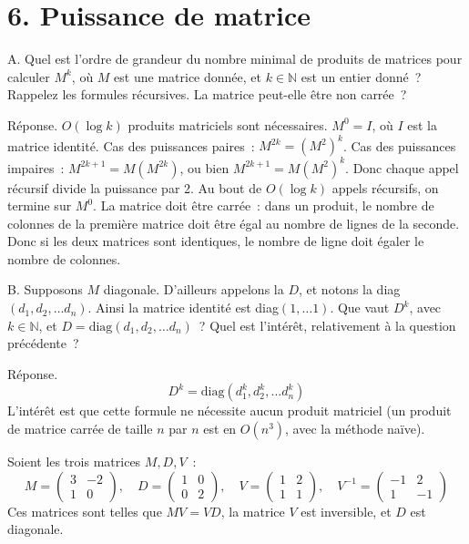 \documentclass[11pt]{article}
\def\N{\mathbb N}
\begin{document}
\section*{6. Puissance de matrice}

A. Quel est l'ordre de grandeur du nombre minimal de produits de matrices pour calculer $M^k$, où $M$ est une matrice donnée, et $k\in \N$ est un entier donné~?
Rappelez les formules récursives. La matrice peut-elle être non carrée~?

Réponse. $O(\log k)$ produits matriciels sont nécessaires.
$M^0=I$, où $I$ est la matrice identité.
Cas des puissances paires~: $M^{2k} = (M^2)^k$.
Cas des puissances impaires~:  $M^{2k+1} = M (M^{2k})$, ou bien
$M^{2k+1} = M (M^2)^{k}$. Donc chaque appel récursif divide la puissance par 2.
Au bout de $O(\log k)$ appels récursifs, on termine sur $M^0$.
La matrice doit être carrée~: dans un produit, le nombre de colonnes de la première matrice doit être égal au nombre de lignes de la seconde. Donc si les deux matrices sont identiques, le nombre de ligne doit égaler le nombre de colonnes.

B. Supposons $M$ diagonale. D'ailleurs appelons la $D$, et
notons la diag$(d_1, d_2, \ldots d_n)$. Ainsi la matrice identité est 
diag$(1, \ldots 1)$. Que vaut $D^k$, avec $k\in \N$, et $D=\mbox{diag}(d_1, d_2, \ldots d_n)$~?
Quel est l'intérêt, relativement à la question précédente~?

Réponse. $$D^k=\mbox{diag}(d_1^k, d_2^k, \ldots d_n^k)$$
L'intérêt est que cette formule ne nécessite aucun produit matriciel (un produit de matrice carrée de taille $n$ par $n$ est en $O(n^3)$, avec la méthode naïve).



Soient  les trois matrices $M, D, V$~: 
$$M=\left( \begin{array}{cc} 3 & -2\\
1 & 0 
\end{array}\right), \quad D=\left( \begin{array}{cc} 1 & 0 \\
0 & 2 \end{array}\right), \quad V=\left( \begin{array}{cc} 1 & 2 \\
1  & 1 \end{array}\right), \quad V^{-1}=\left( \begin{array}{cc} -1 & 2 \\
1  & -1 \end{array}\right) $$
Ces matrices sont telles que $MV=VD$, la matrice $V$ est inversible,
et $D$ est diagonale. 
\end{document}
